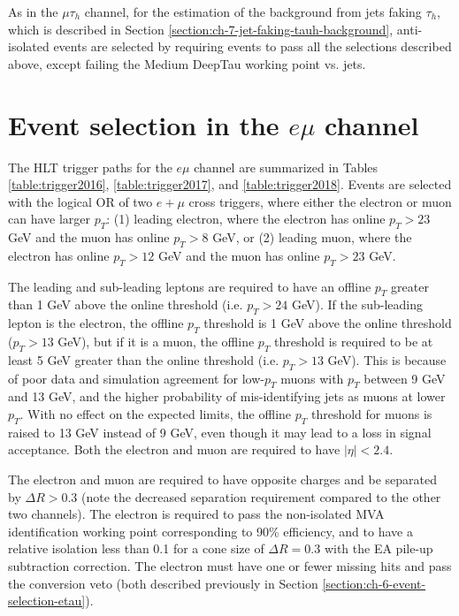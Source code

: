 As in the $\mu\tau_{h}$ channel, for the estimation of the background from jets faking $\tau_{h}$, which is described in Section \ref{section:ch-7-jet-faking-tauh-background}, anti-isolated events are selected by requiring events to pass all the selections described above, except failing the Medium DeepTau working point vs. jets.

\section{Event selection in the \texorpdfstring{$e\mu$}{emu} channel}
\label{section:ch-6-event-selection-emu}

The HLT trigger paths for the $e\mu$ channel are summarized in Tables \ref{table:trigger2016}, \ref{table:trigger2017}, and \ref{table:trigger2018}. Events are selected with the logical OR of two $e+\mu$ cross triggers, where either the electron or muon can have larger $p_{T}$: (1) leading electron, where the electron has online $p_{T} > 23$ GeV and the muon has online $p_{T} > 8$ GeV, or (2) leading muon, where the electron has online $p_{T} > 12$ GeV and the muon has online $p_{T}>23$ GeV.

The leading and sub-leading leptons are required to have an offline $p_{T}$ greater than 1 GeV above the online threshold (i.e. $p_{T} > 24$ GeV). If the sub-leading lepton is the electron, the offline $p_{T}$ threshold is 1 GeV above the online threshold ($p_{T} > 13$ GeV), but if it is a muon, the offline $p_{T}$ threshold is required to be at least 5 GeV greater than the online threshold (i.e. $p_T > 13$ GeV). This is because of poor data and simulation agreement for low-$p_T$ muons with $p_T$ between 9 GeV and 13 GeV, and the higher probability of mis-identifying jets as muons at lower $p_{T}$. With no effect on the expected limits, the offline $p_{T}$ threshold for muons is raised to 13 GeV instead of 9 GeV, even though it may lead to a loss in signal acceptance. Both the electron and muon are required to have $|\eta| < 2.4$.

The electron and muon are required to have opposite charges and be separated by $\Delta R > 0.3$ (note the decreased separation requirement compared to the other two channels). The electron is required to pass the non-isolated MVA identification working point corresponding to 90\% efficiency, and to have a relative isolation less than 0.1 for a cone size of $\Delta R = 0.3$ with the EA pile-up subtraction correction. The electron must have one or fewer missing hits and pass the conversion veto (both described previously in Section \ref{section:ch-6-event-selection-etau}). 

